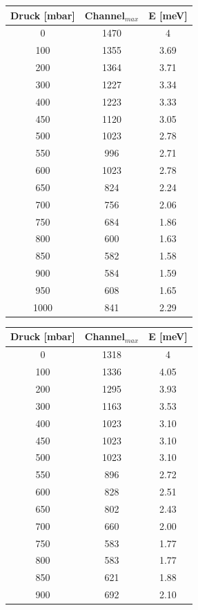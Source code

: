 \begin{minipage}[t]{0.3\textwidth}
\begin{tabular}{|c|c|c|} 
Druck [mbar]	&Channel$_{max}$	& E [meV]\\ \hline
0		&1470			&4\\ \hline
100		&1355			&3.69\\ \hline
200		&1364			&3.71\\ \hline
300		&1227			&3.34\\ \hline
400		&1223			&3.33\\ \hline
450		&1120			&3.05\\ \hline
500		&1023			&2.78\\ \hline
550		&996			&2.71\\ \hline
600		&1023			&2.78\\ \hline
650		&824			&2.24\\ \hline
700		&756			&2.06\\ \hline
750		&684			&1.86\\ \hline
800		&600			&1.63\\ \hline
850		&582			&1.58\\ \hline
900		&584			&1.59\\ \hline
950		&608			&1.65\\ \hline
1000	&841			&2.29\\ \hline
\end{tabular}
\end{minipage}
\hspace{3cm}
\begin{minipage}[t]{0.3\textwidth}
\begin{tabular}{|c|c|c|}
Druck [mbar]	&Channel$_{max}$	& E [meV]\\ \hline
0	&1318			&4\\ \hline
100	&1336			&4.05\\ \hline
200	&1295			&3.93\\ \hline
300	&1163			&3.53\\ \hline
400	&1023			&3.10\\ \hline
450	&1023			&3.10\\ \hline
500	&1023			&3.10\\ \hline
550	&896			&2.72\\ \hline
600	&828			&2.51\\ \hline
650	&802			&2.43\\ \hline
700	&660			&2.00\\ \hline
750	&583			&1.77\\ \hline
800	&583			&1.77\\ \hline
850	&621			&1.88\\ \hline
900	&692			&2.10\\ \hline
\end{tabular}
\end{minipage}

